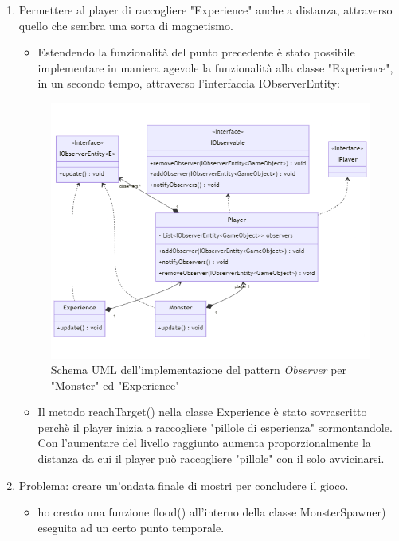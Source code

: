 \documentclass[a4paper,12pt]{report}
\begin{document}
\begin{enumerate}
\item Permettere al player di raccogliere "Experience" anche a distanza, attraverso quello che sembra una sorta di magnetismo.
\begin{itemize}
	\item Estendendo la funzionalità del punto precedente è stato possibile implementare in maniera agevole la funzionalità alla classe "Experience", in un secondo tempo, attraverso l'interfaccia IObserverEntity:
\end{itemize}
\begin{figure}[H]
	\centering{}
\includegraphics[width=\textwidth]{img/monsterObserver2Mermaid.png}
	\caption{Schema UML dell'implementazione del pattern \emph{Observer} per "Monster" ed "Experience"}
\label{img:Observer Pattern}
\end{figure}
%
\begin{itemize}
	\item Il metodo reachTarget() nella classe Experience è stato sovrascritto perchè il player inizia a raccogliere "pillole di esperienza" sormontandole. Con l'aumentare del livello raggiunto aumenta proporzionalmente la distanza da cui il player può raccogliere "pillole" con il solo avvicinarsi.
\end{itemize}
%
\item Problema: creare un'ondata finale di mostri per concludere il gioco.
\begin{itemize}
	\item ho creato una funzione flood() all'interno della classe MonsterSpawner) eseguita ad un certo punto temporale.

\end{itemize}
\end{enumerate}
\end{document}
